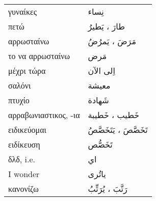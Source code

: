 \documentclass[twocolumn,a4paper]{article}
\newcommand{\ar}[1]{\textarabic{#1}}
\newcommand{\vrf}{\raisebox{0.15ex}{\footnotesize ◉}}
\newcommand{\mas}{\raisebox{0.15ex}{\footnotesize ◫}}
\begin{document}
\begin{mpsupertabular}{ P{0.5\textwidth} P{0.5\textwidth} }
γυναίκες                     & \ar{ نِساء } \\
πετώ \vrf                    & \ar{ طارَ ، يَطيرُ } \\
αρρωσταίνω \vrf              & \ar{ مَرَضَ ، يَمرُضُ } \\
το να αρρωσταίνω \mas        & \ar{ مَرض } \\
μέχρι τώρα                   & \ar{ اِلى اﻵن } \\
σαλόνι                       & \ar{ معيشة } \\
πτυχίο                       & \ar{ شَهادة } \\
αρραβωνιαστικος, -ια         & \ar{ خَطيب ، خَطيبة } \\
ειδικεύομαι \vrf             & \ar{ تَخَصَّصَ ، يَتَخَصَّصُ } \\
ειδίκευση \mas               & \ar{ تَخَصُّص } \\
δλδ, i.e.                    & \ar{ اي } \\
I wonder                     & \ar{ ياتُرى } \\
κανονίζω \vrf                & \ar{ رَتَّبَ ، يُرَتِّبُ } \\ %


\end{mpsupertabular}
\end{document}
